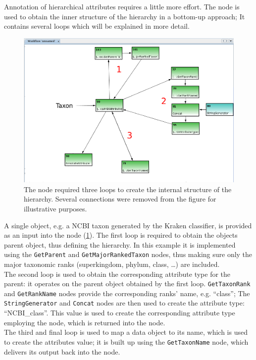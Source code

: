Annotation of hierarchical attributes requires a little more effort. The  node
is used to obtain the inner structure of the hierarchy in a bottom-up approach; It contains several loops which
will be explained in more detail.

\begin{figure}[H]
\centering
\includegraphics[width=\textwidth]{img/conveyor/TreeAnnot}
\caption[Hierarchical attributes]{The  node required three loops
to create the internal structure of the hierarchy. Several connections were removed from the figure
for illustrative purposes.}
\label{annot5}
\end{figure}

A single object, e.g. a NCBI taxon generated by the Kraken\cite{KRAKEN} classifier, is provided as an input
into the node (\ref{annot5}). 
The first loop is required to obtain the objects parent object, thus defining the hierarchy. In this example
it is implemented using the \texttt{GetParent} and \texttt{GetMajorRankedTaxon} nodes, thus making sure only
the major taxonomic ranks (superkingdom, phylum, class, \dots) are included.\\
The second loop is used to obtain the corresponding attribute type for the parent: it operates on the parent
object obtained by the first loop. \texttt{GetTaxonRank} and \texttt{GetRankName} nodes provide the corresponding
ranks' name, e.g. ``class''; The \texttt{StringGenerator} and \texttt{Concat} nodes are then used to create the
attribute type: ``NCBI\_class''. This value is used to create the corresponding attribute type employing the
 node, which is returned into the  node.\\
The third and final loop is used to map a data object to its name, which is used to create the attributes value;
it is built up using the \texttt{GetTaxonName} node, which delivers its output back into the node.\\

